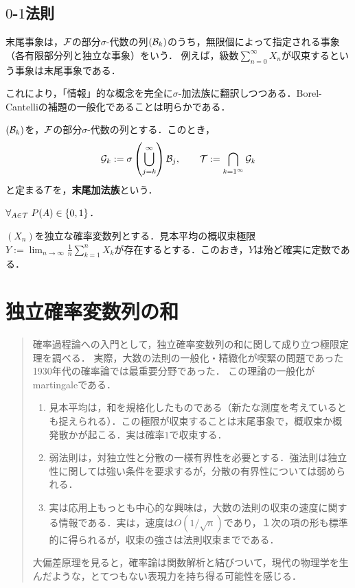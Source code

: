 \documentclass[uplatex,dvipdfmx]{jsreport}
\begin{document}
\section{$0$-$1$法則}

\begin{tcolorbox}[colframe=ForestGreen, colback=ForestGreen!10!white,breakable,colbacktitle=ForestGreen!40!white,coltitle=black,fonttitle=\bfseries\sffamily,
title=]
    末尾事象は，$\mathcal{F}$の部分$\sigma$-代数の列$(\mathcal{B}_k)$のうち，無限個によって指定される事象（各有限部分列と独立な事象）をいう．
    例えば，級数$\sum_{n=0}^\infty X_n$が収束するという事象は末尾事象である．

    これにより，「情報」的な概念を完全に$\sigma$-加法族に翻訳しつつある．Borel-Cantelliの補題の一般化であることは明らかである．
\end{tcolorbox}

\begin{definition}
    $(\mathcal{B}_k)$を，$\mathcal{F}$の部分$\sigma$-代数の列とする．このとき，
    \[\mathcal{G}_k:=\sigma\left(\bigcup_{j=k}^\infty\right)\mathcal{B}_j,\qquad\mathcal{T}:=\bigcap_{k=1^\infty}\mathcal{G}_k\]
    と定まる$\mathcal{T}$を，\textbf{末尾加法族}という．
\end{definition}

\begin{theorem}[Kolmogorov 0-1]
    $\forall_{A\in\mathcal{T}}\;P(A)\in\{0,1\}$．
\end{theorem}

\begin{corollary}
    $(X_n)$を独立な確率変数列とする．見本平均の概収束極限$Y:=\lim_{n\to\infty}\frac{1}{n}\sum_{k=1}^nX_k$が存在するとする．このおき，$Y$は殆ど確実に定数である．
\end{corollary}

\chapter{独立確率変数列の和}

\begin{quotation}
    確率過程論への入門として，独立確率変数列の和に関して成り立つ極限定理を調べる．
    実際，大数の法則の一般化・精緻化が喫緊の問題であった1930年代の確率論では最重要分野であった．
    この理論の一般化がmartingaleである．
    \begin{enumerate}
        \item 見本平均は，和を規格化したものである（新たな測度を考えているとも捉えられる）．この極限が収束することは末尾事象で，概収束か概発散かが起こる．実は確率$1$で収束する．
        \item 弱法則は，対独立性と分散の一様有界性を必要とする．強法則は独立性に関しては強い条件を要求するが，分散の有界性については弱められる．
        \item 実は応用上もっとも中心的な興味は，大数の法則の収束の速度に関する情報である．実は，速度は$O(1/\sqrt{n})$であり，１次の項の形も標準的に得られるが，収束の強さは法則収束までである．
    \end{enumerate}

    大偏差原理を見ると，確率論は関数解析と結びついて，現代の物理学を生んだような，とてつもない表現力を持ち得る可能性を感じる．
\end{quotation}
\end{document}

